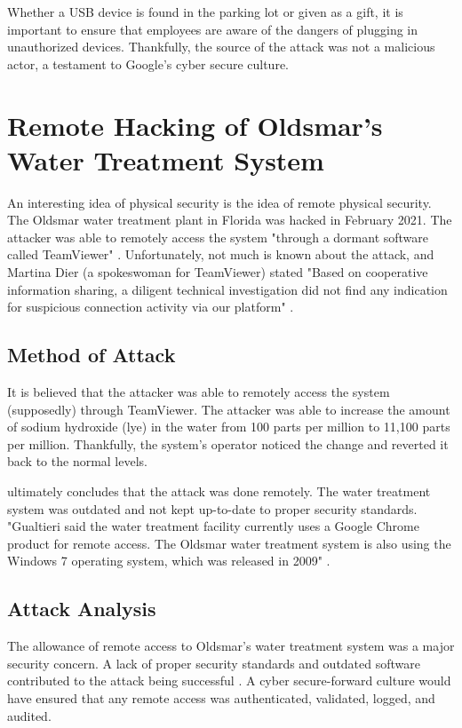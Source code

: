 \documentclass[acmsmall]{acmart}
\begin{document}
Whether a USB device is found in the parking lot or given as a gift, it is important
to ensure that employees are aware of the dangers of plugging in unauthorized devices.
Thankfully, the source of the attack was not a malicious actor, a testament to
Google's cyber secure culture.

\section{Remote Hacking of Oldsmar's Water Treatment System}
An interesting idea of physical security is the idea of remote physical security.
The Oldsmar water treatment plant in Florida was hacked in February 2021. The
attacker was able to remotely access the system
"through a dormant software called TeamViewer" \cite{CCNFlorida}.
Unfortunately, not much is known about the attack, and Martina Dier (a spokeswoman
for TeamViewer) stated "Based on cooperative information sharing, a diligent technical
investigation did not find any indication for suspicious connection activity via our
platform" \cite{CCNFlorida}.

\subsection{Method of Attack}
It is believed that the attacker was able to remotely access the system (supposedly)
through TeamViewer. The attacker was able to increase the amount of sodium hydroxide (lye)
in the water from 100 parts per million to 11,100 parts per million. Thankfully,
the system's operator noticed the change and reverted it back to the normal levels.

\cite{CCNFlorida} ultimately concludes that the attack was done remotely. The
water treatment system was outdated and not kept up-to-date to proper security
standards. "Gualtieri said the water treatment facility currently uses a Google
Chrome product for remote access. The Oldsmar water treatment system is also using
the Windows 7 operating system, which was released in 2009" \cite{CCNFlorida}.

\subsection{Attack Analysis}
The allowance of remote access to Oldsmar's water treatment system was a major
security concern. A lack of proper security standards and outdated software
contributed to the attack being successful \cite{CCNFlorida}. A cyber secure-forward
culture would have ensured that any remote access was authenticated, validated,
logged, and audited.
\end{document}
